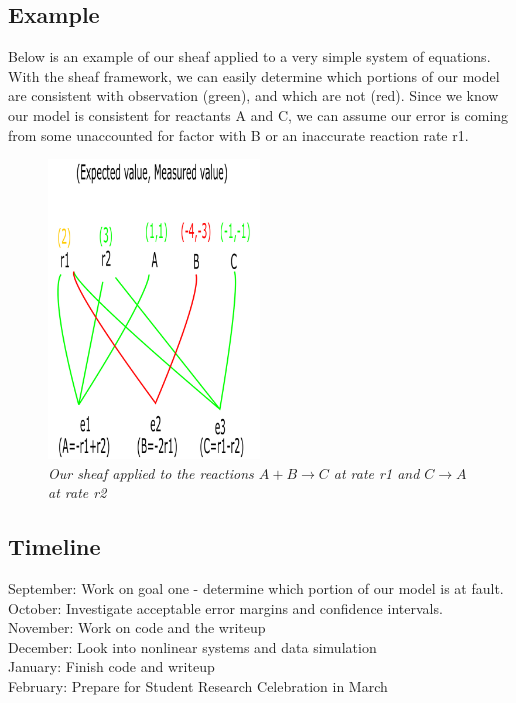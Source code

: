 \documentclass[12pt]{article}
\begin{document}
\subsection{Example}
Below is an example of our sheaf applied to a very simple system of equations. With the sheaf framework, we can easily determine which portions of our model are consistent with observation (green), and which are not (red). Since we know our model is consistent for reactants A and C, we can assume our error is coming from some unaccounted for factor with B or an inaccurate reaction rate r1.  
\begin{figure}[h]
	\caption{\textit{Our sheaf applied to the reactions $A + B\rightarrow C$ at rate r1 and $C \rightarrow A$ at rate r2}}
	
	\centering
	\includegraphics[width=0.5\textwidth, height=0.2\textheight]{USP2018f.PNG}
\end{figure}

\subsection{Timeline}
September: Work on goal one - determine which portion of our model is at fault.\\
October: Investigate acceptable error margins and confidence intervals. \\
November: Work on code and the writeup\\
December: Look into nonlinear systems and data simulation\\
January: Finish code and writeup\\
February: Prepare for Student Research Celebration in March
\end{document}
